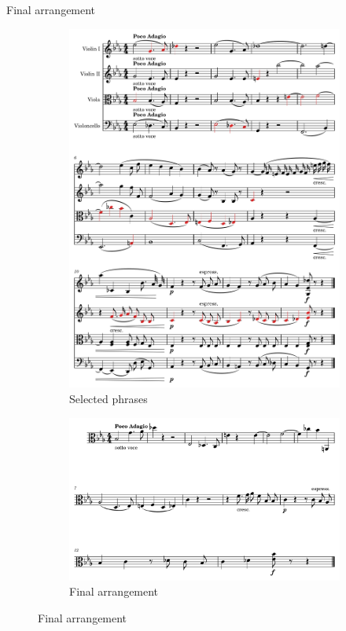 \documentclass[handout]{beamer}
\begin{document}
\begin{frame}{Final arrangement}
    \begin{figure}
        \begin{subfigure}{0.5\linewidth}
            \includegraphics[width=.95\linewidth]{../Figures/selected-1.png}
            \caption{Selected phrases}
        \end{subfigure}\hfill
        \begin{subfigure}{0.5\linewidth}
            \includegraphics[width=.95\linewidth]{../Figures/arrangement-1.png}
            \caption{Final arrangement}
        \end{subfigure}
    \end{figure}


\end{frame}
\end{document}
